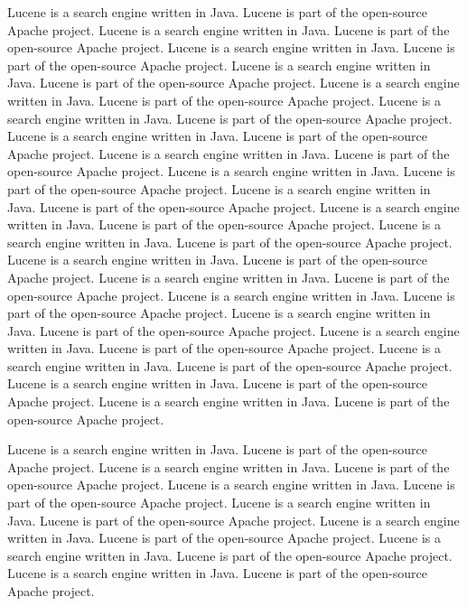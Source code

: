 Lucene is a search engine written in Java.  Lucene is part of the
open-source Apache project.
Lucene is a search engine written in Java.  Lucene is part of the
open-source Apache project.
Lucene is a search engine written in Java.  Lucene is part of the
open-source Apache project.
Lucene is a search engine written in Java.  Lucene is part of the
open-source Apache project.
Lucene is a search engine written in Java.  Lucene is part of the
open-source Apache project.
Lucene is a search engine written in Java.  Lucene is part of the
open-source Apache project.
Lucene is a search engine written in Java.  Lucene is part of the
open-source Apache project.
Lucene is a search engine written in Java.  Lucene is part of the
open-source Apache project.
Lucene is a search engine written in Java.  Lucene is part of the
open-source Apache project.
Lucene is a search engine written in Java.  Lucene is part of the
open-source Apache project.
Lucene is a search engine written in Java.  Lucene is part of the
open-source Apache project.
Lucene is a search engine written in Java.  Lucene is part of the
open-source Apache project.
Lucene is a search engine written in Java.  Lucene is part of the
open-source Apache project.
Lucene is a search engine written in Java.  Lucene is part of the
open-source Apache project.
Lucene is a search engine written in Java.  Lucene is part of the
open-source Apache project.
Lucene is a search engine written in Java.  Lucene is part of the
open-source Apache project.
Lucene is a search engine written in Java.  Lucene is part of the
open-source Apache project.
Lucene is a search engine written in Java.  Lucene is part of the
open-source Apache project.
Lucene is a search engine written in Java.  Lucene is part of the
open-source Apache project.
Lucene is a search engine written in Java.  Lucene is part of the
open-source Apache project.

Lucene is a search engine written in Java.  Lucene is part of the
open-source Apache project.
Lucene is a search engine written in Java.  Lucene is part of the
open-source Apache project.
Lucene is a search engine written in Java.  Lucene is part of the
open-source Apache project.
Lucene is a search engine written in Java.  Lucene is part of the
open-source Apache project.
Lucene is a search engine written in Java.  Lucene is part of the
open-source Apache project.
Lucene is a search engine written in Java.  Lucene is part of the
open-source Apache project.
Lucene is a search engine written in Java.  Lucene is part of the
open-source Apache project.

